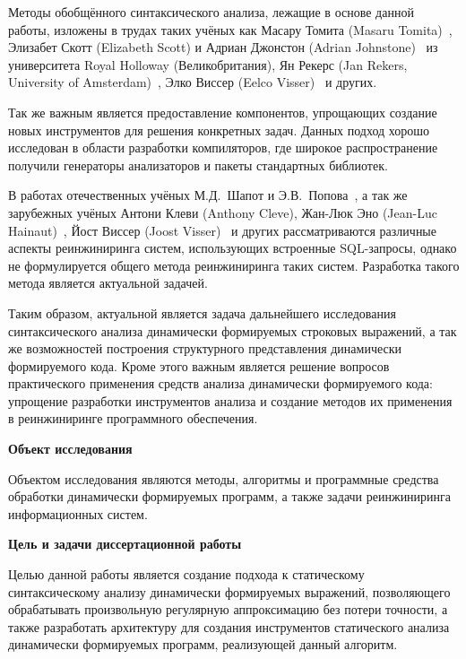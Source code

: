 Методы обобщённого синтаксического анализа, лежащие в основе данной работы, изложены в трудах таких учёных как Масару Томита (Masaru Tomita)~\cite{Tomita}, Элизабет Скотт (Elizabeth Scott) и Адриан Джонстон (Adrian Johnstone)~\cite{RNGLR,RIGLR} из университета Royal Holloway (Великобритания), Ян Рекерс (Jan Rekers, University of Amsterdam)~\cite{SPPF}, Элко Виссер (Eelco Visser)~\cite{RNGLRSyntaxerror2,RNGLRSyntaxerror3} и других.

Так же важным является предоставление компонентов, упрощающих создание новых инструментов для решения конкретных задач. Данных подход хорошо исследован в области разработки компиляторов, где широкое распространение получили генераторы анализаторов и пакеты стандартных библиотек. 

В работах отечественных учёных М.Д.~Шапот и Э.В.~Попова~\cite{DynamicDSQLTranslation}, а так же зарубежных учёных Антони Клеви (Anthony Cleve), Жан-Люк Эно (Jean-Luc Hainaut)~\cite{DSQLReverseEngineering}, Йост Виссер (Joost Visser)~\cite{DSQLQualityMesure} и других рассматриваются различные аспекты реинжиниринга систем, использующих встроенные SQL-запросы, однако не формулируется общего метода реинжиниринга таких систем. Разработка такого метода является актуальной задачей.

Таким образом, актуальной является задача дальнейшего исследования синтаксического анализа динамически формируемых строковых выражений, а так же возможностей построения структурного представления динамически формируемого кода. Кроме этого важным является решение вопросов практического применения средств анализа динамически формируемого кода: упрощение разработки инструментов анализа и создание методов их применения в реинжиниринге программного обеспечения.

\textbf{Объект исследования}

 Объектом исследования являются методы, алгоритмы и программные средства обработки динамически формируемых программ, а также задачи реинжиниринга информационных систем.

\textbf{Цель и задачи диссертационной работы}

Целью данной работы является создание подхода к статическому синтаксическому анализу динамически формируемых выражений, позволяющего обрабатывать произвольную регулярную аппроксимацию без потери точности, а также разработать архитектуру для создания инструментов статического анализа динамически формируемых программ, реализующей данный алгоритм.

